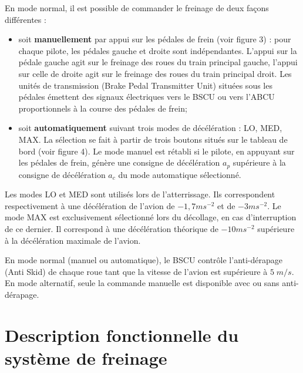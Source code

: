 \documentclass[11pt,oneside]{article}
\begin{document}
{\begin{minipage}[c]{.3\linewidth}
\end{minipage}\hfill
\begin{minipage}[c]{.67\linewidth}
En mode normal, il est possible de commander le freinage de deux façons
différentes :
\begin{itemize}
 \item soit \textbf{manuellement} par appui sur les pédales de frein (voir figure 3) : pour chaque pilote, les pédales gauche et droite sont indépendantes. L’appui sur la pédale gauche agit sur le freinage des roues du train principal gauche, l’appui sur celle de droite agit sur le freinage des roues du train principal droit. Les unités de transmission (Brake Pedal Transmitter Unit) situées sous les pédales émettent des signaux électriques vers le BSCU ou vers l’ABCU proportionnels à la course des pédales de frein;
\item soit \textbf{automatiquement} suivant trois modes de décélération : LO, MED, MAX. La sélection se fait à partir de trois boutons situés sur le tableau de bord (voir figure 4). Le mode manuel est rétabli si le pilote, en appuyant sur les pédales de frein, génère une consigne de
décélération $a_p$ supérieure à la consigne de décélération $a_c$ du mode automatique sélectionné.
\end{itemize}                                                    
\end{minipage}

\vspace{.25cm} 

Les modes LO et MED sont utilisés lors de l’atterrissage. Ils correspondent
respectivement à une
décélération de l’avion de $-1,7 ms^{-2}$ et de $-3 ms^{-2}$. Le mode MAX est
exclusivement sélectionné lors du
décollage, en cas d’interruption de ce dernier. Il correspond à une décélération
théorique de $-10 ms^{-2}$
supérieure à la décélération maximale de l’avion.

En mode normal (manuel ou automatique), le BSCU contrôle l’anti-dérapage (Anti
Skid) de chaque roue
tant que la vitesse de l’avion est supérieure à $5\;m/s$.
En mode alternatif, seule la commande manuelle est disponible avec ou sans
anti-dérapage.
 
}
\section{Description fonctionnelle du système de freinage}
\end{document}
